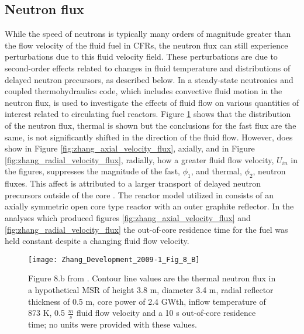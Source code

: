 \documentclass[review]{elsarticle}
\begin{document}
\subsection{Neutron flux} \label{ssec:flux}
While the speed of neutrons is typically many orders of magnitude greater than
the flow velocity of the fluid fuel in CFRs, the neutron flux can still experience
perturbations due to this fluid velocity field. These perturbations are due to
second-order effects related to changes in fluid temperature and distributions of
 delayed neutron precursors, as described below. In \cite{zhang_development_2009-1}
 a steady-state  neutronics and coupled thermohydraulics code, which includes convective
fluid motion in the neutron flux, is used to investigate the effects of fluid
flow on various quantities of interest related to circulating fuel reactors. 
Figure \ref{fig:zhang_2d_flux} \cite{zhang_development_2009-1} shows that the
distribution of the neutron flux, thermal is shown but the conclusions for the fast flux are the same, is not significantly shifted in the direction
of the fluid flow. However, \cite{zhang_development_2009-1} does show in Figure \ref{fig:zhang_axial_velocity_flux}, axially, and in Figure \ref{fig:zhang_radial_velocity_flux}, radially, how a greater fluid flow
 velocity, $U_{in}$ in the figures, suppresses the magnitude of the fast, $\phi_{1}$, and thermal, $\phi_{2}$, neutron fluxes. This affect is
 attributed to a larger transport of delayed neutron precursors outside of the core \cite{zhang_development_2009-1}. The reactor model
 utilized in \cite{zhang_development_2009-1} consists of an axially symmetric
 open core type reactor with an outer graphite reflector. In the analyses which
 produced figures \ref{fig:zhang_axial_velocity_flux} and \ref{fig:zhang_radial_velocity_flux} the
 out-of-core residence time for the fuel was held constant despite a changing
 fluid flow velocity.

\begin{figure}[h]
   \centering
   \texttt{[image: Zhang\_Development\_2009-1\_Fig\_8\_B]}
   \caption{Figure 8.b from \cite{zhang_development_2009-1}. Contour line
    values are the thermal neutron flux in a hypothetical MSR of height 3.8 m, diameter 3.4 m,
    radial reflector thickness of 0.5 m, core power of 2.4 GWth, inflow temperature of 873 K,
    0.5 $\frac{m}{s}$ fluid flow
    velocity and a 10 s out-of-core residence time; no units were provided with these values.} 
   \label{fig:zhang_2d_flux}
\end{figure}
\end{document}
